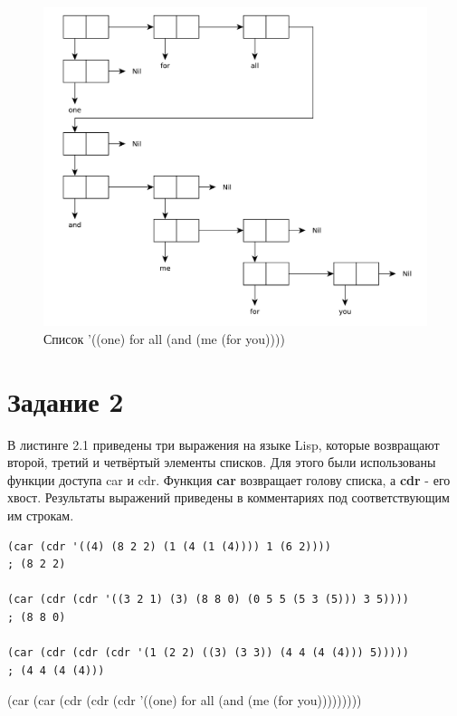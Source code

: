 \begin{enumerate}
\begin{figure}[H]
            \includegraphics[scale=0.60]{data/pdf/01-06.pdf}
            \caption{Список '((one) for all (and (me (for you))))}
        \end{figure}
\end{enumerate}

\section{Задание \No{}2}

В листинге 2.1 приведены три выражения на языке Lisp, которые возвращают второй, третий и четвёртый элементы списков. Для этого были использованы функции доступа car и cdr. Функция \textbf{car} возвращает голову списка, а \textbf{cdr} - его хвост. Результаты выражений приведены в комментариях под соответствующим им строкам.

\lstset{language=lisp}
\begin{lstlisting}[caption={Выражения, возвращающие 2, 3 и 4 элементы списка}]
(car (cdr '((4) (8 2 2) (1 (4 (1 (4)))) 1 (6 2))))
; (8 2 2)

(car (cdr (cdr '((3 2 1) (3) (8 8 0) (0 5 5 (5 3 (5))) 3 5))))
; (8 8 0)

(car (cdr (cdr (cdr '(1 (2 2) ((3) (3 3)) (4 4 (4 (4))) 5)))))
; (4 4 (4 (4)))
\end{lstlisting}

(car (car (cdr (cdr (cdr '((one) for all (and (me (for you)))))))))
